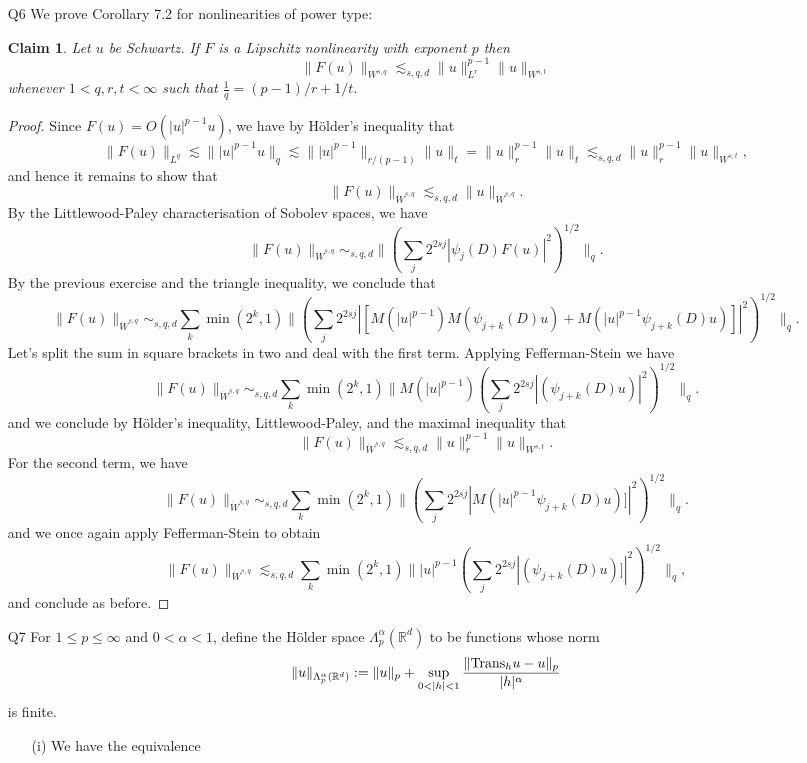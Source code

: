 \documentclass[11pt]{article}
\newtheorem*{claim}{Claim}
\theoremstyle{remark}
\newcommand{\1}{\textbf{1}}
\newcommand{\lle}{\lesssim}
\def\norm#1{\| #1  \|}
\newcommand{\bbR}{\mathbb{R}}
\begin{document}
\begin{enumerate}
\begin{proof}
\[\]
we obtain the result.
\end{proof}
\item[Q6] We prove Corollary 7.2 for nonlinearities of power type:
\begin{claim}
Let $u$ be Schwartz. If $F$ is a Lipschitz nonlinearity with exponent $p$ then
\[
\norm{F(u)}_{W^{s,q}} \lle_{s,q,d} \norm{u}^{p-1}_{L^r} \norm{u}_{W^{s,t}}
\]
whenever $1< q,r, t < \infty$ such that $\frac{1}{q} = (p-1)/r + 1/t.$
\end{claim}
\begin{proof}
Since $F(u) = O(|u|^{p-1} u)$, we have by H\"older's inequality that 
\[
\norm{F(u)}_{L^q} \lle \norm{|u|^{p-1} u}_q \lle \norm{|u|^{p-1}}_{r/(p-1)} \norm{u}_t = \norm{u}_r^{p-1} \norm{u}_t \lle_{s,q,d} \norm{u}_r^{p-1} \norm{u}_{W^{s,t}},
\]
and hence it remains to show that
\[
\norm{F(u)}_{\dot W^{s,q}} \lle_{s,q,d} \norm{u}_{\dot W^{s,q}}.
\]
By the Littlewood-Paley characterisation of Sobolev spaces, we have
\[
\norm{F(u)}_{\dot W^{s,q}} \sim_{s,q,d} \norm{(\sum_j 2^{2sj}|\psi_j(D) F(u)|^2)^{1/2}}_q.
\]
By the previous exercise and the triangle inequality, we conclude that
\[
\norm{F(u)}_{\dot W^{s,q}} \sim_{s,q,d} \sum_k \min(2^k,1)\norm{(\sum_j 2^{2sj}|[M(|u|^{p-1}) M( \psi_{j +k}(D) u) + M(|u|^{p-1} \psi_{j+k}(D)u)]|^2)^{1/2}}_q.
\]
Let's split the sum in square brackets in two and deal with the first term. Applying Fefferman-Stein we have
\[
\norm{F(u)}_{\dot W^{s,q}} \sim_{s,q,d} \sum_k \min(2^k,1)\norm{M(|u|^{p-1}) (\sum_j 2^{2sj}|( \psi_{j +k}(D) u)|^2)^{1/2}}_q.
\]
and we conclude by H\"older's inequality, Littlewood-Paley, and the maximal inequality that
\[
\norm{F(u)}_{\dot W^{s,q}} \lle_{s,q,d} \norm{u}_r^{p-1}\norm{u}_{W^{s,t}}.
\]
For the second term, we have
\[
\norm{F(u)}_{\dot W^{s,q}} \sim_{s,q,d} \sum_k \min(2^k,1)\norm{(\sum_j 2^{2sj} |M(|u|^{p-1} \psi_{j+k}(D)u)]|^2)^{1/2}}_q.
\]
and we once again apply Fefferman-Stein to obtain
\[
\norm{F(u)}_{\dot W^{s,q}} \lle_{s,q,d} \sum_k \min(2^k,1)\norm{|u|^{p-1}(\sum_j 2^{2sj} |( \psi_{j+k}(D)u)]|^2)^{1/2}}_q,
\]
and conclude as before.
\end{proof}
\item[Q7] For $1\leq p \leq \infty$ and $0< \alpha < 1$, define the H\"older space $\Lambda_p^\alpha(\bbR^d)$ to be functions whose norm
\[
\norm{u}_{\Lambda_p^\alpha(\bbR^d)} := \norm{u}_{p} + \sup_{0<|h|<1} \frac{\norm{\textup{Trans}_h u - u}_p}{|h|^\alpha}
\]
is finite.
\begin{enumerate}
\item[(i)] We have the equivalence

\end{enumerate}
\end{enumerate}
\end{document}
